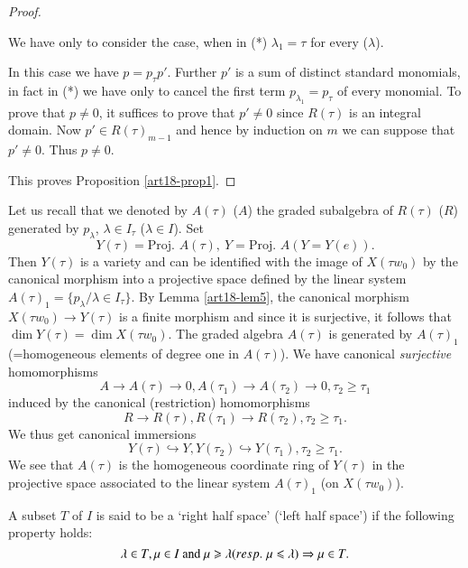 \begin{proof}
\begin{romancase}\label{art18-romancaseii}
We have only to consider the case, when in (*) $\lambda_1 = \tau$ for every ($\lambda$).

In this case we have $p = p_\tau p'$. Further $p'$ is a sum of distinct standard monomials, in fact in (*) we have only to cancel the first term $p_{\lambda_1} = p_\tau$ of every monomial. To prove that $p \neq 0$, it suffices to prove that $p' \neq 0$ since $R(\tau)$ is an integral domain. Now $p' \in R (\tau)_{m-1}$ and hence by induction on 
$m$ we can suppose that $p' \neq 0$. Thus $p\neq 0$.
\end{romancase}

This proves Proposition \ref{art18-prop1}.
\end{proof}

Let us recall that we denoted  by $A(\tau)$ (\resp $A$) the graded subalgebra of $R (\tau)$ (\resp $R$) generated by $p_\lambda$, $\lambda \in I_\tau$ (\resp $\lambda \in I$). Set 
$$
Y (\tau) = \text{Proj. } A (\tau), ~ Y = \text{Proj. } A (Y = Y (e)).
$$
Then $Y(\tau)$ is a variety and can be identified with the image of $X(\tau w_0)$ by the canonical morphism into a projective space defined by the linear system $A(\tau)_1 = \{p_\lambda / \lambda \in I_\tau\}$. By Lemma \ref{art18-lem5}, the canonical morphism $X(\tau w_0) \to Y(\tau)$ is a finite morphism and since it is surjective, it follows that $\dim Y(\tau) = \dim X (\tau w_0)$. The graded algebra $A(\tau)$ is generated by $A(\tau)_1$ (=homogeneous elements of degree one in $A(\tau)$). We have canonical {\em surjective } homomorphisms
$$
A \to A (\tau) \to 0, A (\tau_1) \to A (\tau_2) \to 0, \tau_2 \geqslant \tau_1
$$
induced by the canonical (restriction) homomorphisms
$$
R \to R (\tau), R (\tau_1) \to R (\tau_2), \tau_2 \geqslant \tau_1.
$$
We thus get canonical immersions
$$
Y(\tau) \hookrightarrow Y, Y (\tau_2) \hookrightarrow Y (\tau_1), \tau_2 \geqslant \tau_1.
$$
We see that $A(\tau)$ is the homogeneous coordinate ring of $Y(\tau)$ in the projective space associated to the linear system $A(\tau)_1$ (on $X(\tau w_0)$).

\begin{definition}\label{art18-defi3}
A subset $T$ of $I$ is said to be a `right half space' (\resp `left half space') if the following property holds:
$$
\lambda \in T, \mu \in I \text{~ and ~} \mu \geqslant \lambda ({resp.}\kern.3em \mu \leqslant \lambda) \Rightarrow \mu \in T.
$$
\end{definition}


